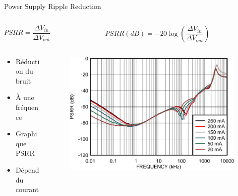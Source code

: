\begin{frame}{Power Supply Ripple Reduction}
    \begin{columns}
        \begin{column}{0.4\textwidth}
            \begin{center}
                $PSRR = \dfrac{\Delta V_{in}}{\Delta V_{out}}$
            \end{center}
        \end{column}
        \pause
        \begin{column}{0.5\textwidth}
            \begin{center}
                $PSRR (dB) = -20 \log \left(\dfrac{\Delta V_{in}}{\Delta V_{out}}\right)$
            \end{center}
        \end{column}
    \end{columns}
    \vfill
    \begin{columns}
        \begin{column}{0.3\textwidth}
            \begin{itemize}
                \item Réduction du bruit
                \item À une fréquence
            \end{itemize}
            \pause
            \vspace{12pt}
            \begin{itemize}
                \item Graphique PSRR
                \item Dépend du courant
            \end{itemize}
        \end{column}
        \begin{column}{0.66\textwidth}
            \begin{figure}
                \centering
                \includegraphics[width=\textwidth]{pictures/psrr-graph.png}
            \end{figure}
        \end{column}
    \end{columns}
\end{frame}


